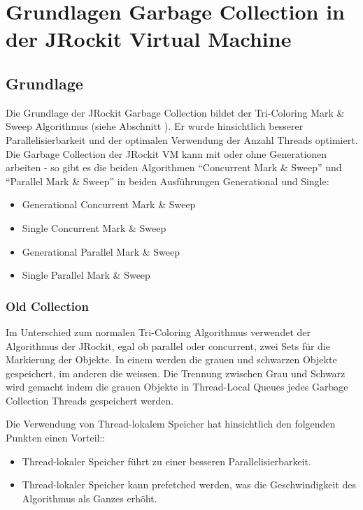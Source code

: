 \chapter{Grundlagen Garbage Collection in der JRockit Virtual Machine}\label{jrockit garbage collection}
\section{Grundlage}
Die Grundlage der JRockit Garbage Collection bildet der Tri-Coloring Mark \& Sweep Algorithmus (siehe Abschnitt ). Er wurde hinsichtlich besserer Parallelisierbarkeit und der optimalen Verwendung der Anzahl Threads optimiert. Die Garbage Collection der JRockit VM kann mit oder ohne Generationen arbeiten - so gibt es die beiden Algorithmen ``Concurrent Mark \& Sweep'' und ``Parallel Mark \& Sweep'' in beiden Ausführungen Generational und Single:

\begin{itemize}
	\item Generational Concurrent Mark \& Sweep
	\item Single Concurrent Mark \& Sweep
	\item Generational Parallel Mark \& Sweep	
	\item Single Parallel Mark \& Sweep
\end{itemize}

\subsection{Old Collection}
Im Unterschied zum normalen Tri-Coloring Algorithmus verwendet der Algorithmus der JRockit, egal ob parallel oder concurrent, zwei Sets für die Markierung der Objekte. In einem werden die grauen und schwarzen Objekte gespeichert, im anderen die weissen. Die Trennung zwischen Grau und Schwarz wird gemacht indem die grauen Objekte in Thread-Local Queues jedes Garbage Collection Threads gespeichert werden. 

Die Verwendung von Thread-lokalem Speicher hat hinsichtlich den folgenden Punkten einen Vorteil:\cite[S. 79]{lagergren2010oracle}:
\begin{itemize}
	\item Thread-lokaler Speicher führt zu einer besseren Parallelisierbarkeit.
	\item Thread-lokaler Speicher kann prefetched werden, was die Geschwindigkeit des Algorithmus als Ganzes erhöht.
\end{itemize}

